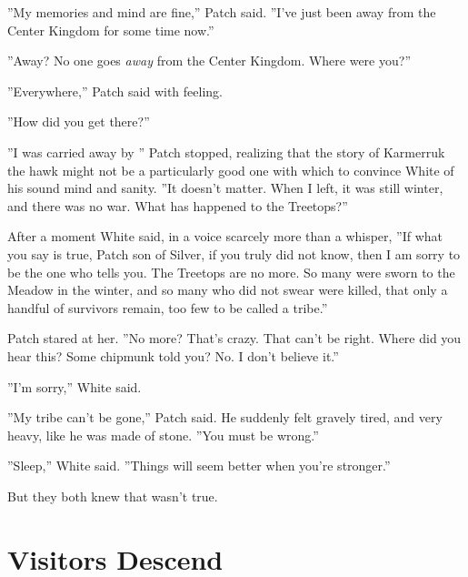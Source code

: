 \documentclass[12pt]{book}
\begin{document}
 ''My memories and mind are fine,'' Patch said. ''I've just been away from the Center Kingdom for some time now.''\par
 ''Away? No one goes {\it away} from the Center Kingdom. Where were you?''\par
 ''Everywhere,'' Patch said with feeling.\par
 ''How did you get there?''\par
 ''I was carried away by %
'' Patch stopped, realizing that the story of Karmerruk the hawk might not be a particularly good one with which to convince White of his sound mind and sanity. ''It doesn't matter. When I left, it was still winter, and there was no war. What has happened to the Treetops?''\par
 After a moment White said, in a voice scarcely more than a whisper, ''If what you say is true, Patch son of Silver, if you truly did not know, then I am sorry to be the one who tells you. The Treetops are no more. So many were sworn to the Meadow in the winter, and so many who did not swear were killed, that only a handful of survivors remain, too few to be called a tribe.''\par
 Patch stared at her. ''No more? That's crazy. That can't be right. Where did you hear this? Some chipmunk told you? No. I don't believe it.''\par
 ''I'm sorry,'' White said.\par
 ''My tribe can't be gone,'' Patch said. He suddenly felt gravely tired, and very heavy, like he was made of stone. ''You must be wrong.''\par
 ''Sleep,'' White said. ''Things will seem better when you're stronger.''\par
 But they both knew that wasn't true.\par

\section{Visitors Descend}
\end{document}
